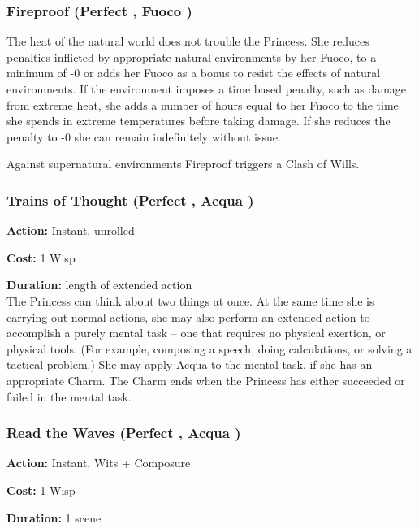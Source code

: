 \subsubsection*{Fireproof (Perfect \textbullet, Fuoco \textbullet)}

The heat of the natural world does not trouble the Princess. She reduces penalties inflicted by appropriate natural environments by her Fuoco, to a minimum of -0 or adds her Fuoco as a bonus to resist the effects of natural environments. If the environment imposes a time based penalty, such as damage from extreme heat, she adds a number of hours equal to her Fuoco to the time she spends in extreme temperatures before taking damage. If she reduces the penalty to -0 she can remain indefinitely without issue. 

Against supernatural environments Fireproof triggers a Clash of Wills.

\subsubsection*{Trains of Thought (Perfect \textbullet, Acqua \textbullet)}

\noindent \textbf{Action:} Instant, unrolled

\noindent \textbf{Cost:} 1 Wisp

\noindent \textbf{Duration:} length of extended action\\

\noindent The Princess can think about two things at once. At the same time she is carrying out normal actions, she may also perform an extended action to accomplish a purely mental task -- one that requires no physical exertion, or physical tools. (For example, composing a speech, doing calculations, or solving a tactical problem.) She may apply Acqua to the mental task, if she has an appropriate Charm. The Charm ends when the Princess has either succeeded or failed in the mental task.

\subsubsection*{Read the Waves (Perfect \textbullet, Acqua \textbullet)}

\noindent \textbf{Action:} Instant, Wits + Composure

\noindent \textbf{Cost:} 1 Wisp

\noindent \textbf{Duration:} 1 scene \\

